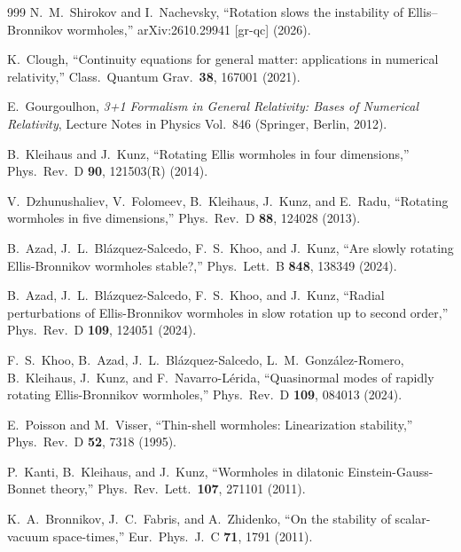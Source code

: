 \documentclass[twocolumn,floatfix,aps,prd,superscriptaddress,nofootinbib,showkeys]{revtex4-2}
\begin{document}
\begin{thebibliography}{999}
N.~M.~Shirokov and I.~Nachevsky,
\newblock ``Rotation slows the instability of Ellis--Bronnikov wormholes,''
\newblock arXiv:2610.29941 [gr-qc] (2026).

K.~Clough,
\newblock ``Continuity equations for general matter: applications in numerical relativity,''
\newblock Class.\ Quantum Grav.\ \textbf{38}, 167001 (2021).

E.~Gourgoulhon,
\newblock \emph{3+1 Formalism in General Relativity: Bases of Numerical Relativity}, Lecture Notes in Physics Vol.~846
\newblock (Springer, Berlin, 2012).

B.~Kleihaus and J.~Kunz,
\newblock ``Rotating Ellis wormholes in four dimensions,''
\newblock Phys.\ Rev.\ D \textbf{90}, 121503(R) (2014).

V.~Dzhunushaliev, V.~Folomeev, B.~Kleihaus, J.~Kunz, and E.~Radu,
\newblock ``Rotating wormholes in five dimensions,''
\newblock Phys.\ Rev.\ D \textbf{88}, 124028 (2013).

B.~Azad, J.~L.~Bl\'azquez-Salcedo, F.~S.~Khoo, and J.~Kunz,
\newblock ``Are slowly rotating Ellis-Bronnikov wormholes stable?,''
\newblock Phys.\ Lett.\ B \textbf{848}, 138349 (2024).

B.~Azad, J.~L.~Bl\'azquez-Salcedo, F.~S.~Khoo, and J.~Kunz,
\newblock ``Radial perturbations of Ellis-Bronnikov wormholes in slow rotation up to second order,''
\newblock Phys.\ Rev.\ D \textbf{109}, 124051 (2024).

F.~S.~Khoo, B.~Azad, J.~L.~Bl\'azquez-Salcedo, L.~M.~Gonz\'alez-Romero, B.~Kleihaus, J.~Kunz, and F.~Navarro-L\'erida,
\newblock ``Quasinormal modes of rapidly rotating Ellis-Bronnikov wormholes,''
\newblock Phys.\ Rev.\ D \textbf{109}, 084013 (2024).

E.~Poisson and M.~Visser,
\newblock ``Thin-shell wormholes: Linearization stability,''
\newblock Phys.\ Rev.\ D \textbf{52}, 7318 (1995).

P.~Kanti, B.~Kleihaus, and J.~Kunz,
\newblock ``Wormholes in dilatonic Einstein-Gauss-Bonnet theory,''
\newblock Phys.\ Rev.\ Lett.\ \textbf{107}, 271101 (2011).

K.~A.~Bronnikov, J.~C.~Fabris, and A.~Zhidenko,
\newblock ``On the stability of scalar-vacuum space-times,''
\newblock Eur.\ Phys.\ J.\ C \textbf{71}, 1791 (2011).



\end{thebibliography}
\end{document}
